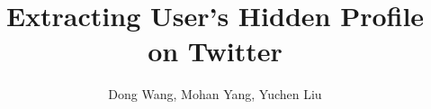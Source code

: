 \documentclass{sig-alternate}
\title{Extracting User's Hidden Profile on Twitter}
\author{Dong Wang, Mohan Yang, Yuchen Liu}
\begin{document}
\maketitle

\begin{abstract}
\end{abstract}









{ }
\end{document}
